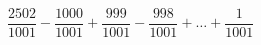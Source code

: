 \begin{ex}[type=calculate]
	\begin{condition}
		\( \dfrac{2502}{1001}-\dfrac{1000}{1001}+\dfrac{999}{1001}-\dfrac{998}{1001}+ \dots +\dfrac{1}{1001} \)
	\end{condition}
\end{ex}